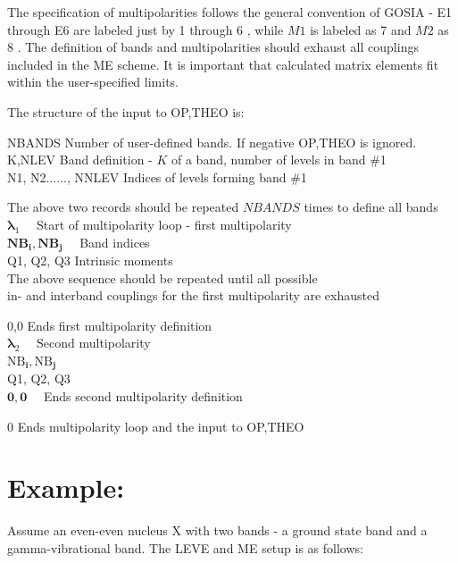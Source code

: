 \documentclass[10pt]{article}
\begin{document}
The specification of multipolarities follows the general convention of GOSIA - E1 through E6 are labeled just by 1 through 6 , while $M 1$ is labeled as 7 and $M 2$ as 8 . The definition of bands and multipolarities should exhaust all couplings included in the ME scheme. It is important that calculated matrix elements fit within the user-specified limits.

The structure of the input to OP,THEO is:

NBANDS Number of user-defined bands. If negative OP,THEO is ignored.\\
K,NLEV Band definition - $K$ of a band, number of levels in band \#1\\
N1, N2......, NNLEV Indices of levels forming band \#1

The above two records should be repeated $N B A N D S$ times to define all bands\\
$\boldsymbol{\lambda}_{1} \quad$ Start of multipolarity loop - first multipolarity\\
$\mathbf{N B}_{\mathbf{i}}, \mathbf{N B}_{\mathbf{j}} \quad$ Band indices\\
Q1, Q2, Q3 Intrinsic moments\\
The above sequence should be repeated until all possible\\
in- and interband couplings for the first multipolarity are exhausted

0,0 Ends first multipolarity definition\\
$\boldsymbol{\lambda}_{2} \quad$ Second multipolarity\\
$\mathrm{NB}_{\mathbf{i}}, \mathrm{NB}_{\mathbf{j}}$\\
Q1, Q2, Q3\\
$\mathbf{0}, \mathbf{0} \quad$ Ends second multipolarity definition

0 Ends multipolarity loop and the input to OP,THEO

\section*{Example:}
Assume an even-even nucleus X with two bands - a ground state band and a gamma-vibrational band. The LEVE and ME setup is as follows:
\end{document}
